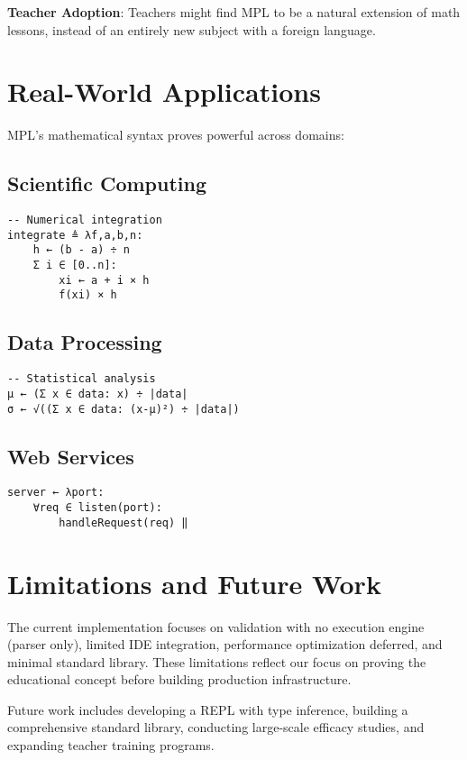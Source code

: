 \documentclass[10pt,conference]{IEEEtran}
\begin{document}
\textbf{Teacher Adoption}: Teachers might find MPL to be a natural extension of math lessons, instead of an entirely new subject with a foreign language.

\section{Real-World Applications}

MPL's mathematical syntax proves powerful across domains:

\subsection{Scientific Computing}
\begin{lstlisting}[language=MPL]
-- Numerical integration
integrate ≜ λf,a,b,n:
    h ← (b - a) ÷ n
    Σ i ∈ [0..n]: 
        xi ← a + i × h
        f(xi) × h
\end{lstlisting}

\subsection{Data Processing}
\begin{lstlisting}[language=MPL]
-- Statistical analysis
μ ← (Σ x ∈ data: x) ÷ |data|
σ ← √((Σ x ∈ data: (x-μ)²) ÷ |data|)
\end{lstlisting}

\subsection{Web Services}
\begin{lstlisting}[language=MPL]
server ← λport:
    ∀req ∈ listen(port):
        handleRequest(req) ‖
\end{lstlisting}

\section{Limitations and Future Work}

The current implementation focuses on validation with no execution engine (parser only), limited IDE integration, performance optimization deferred, and minimal standard library. These limitations reflect our focus on proving the educational concept before building production infrastructure.

Future work includes developing a REPL with type inference, building a comprehensive standard library, conducting large-scale efficacy studies, and expanding teacher training programs.
\end{document}
